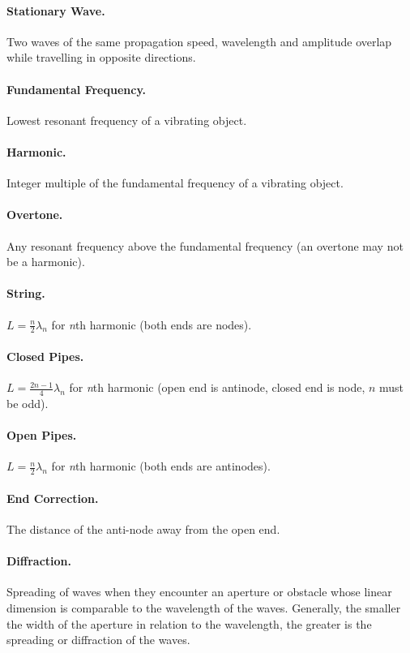 \documentclass{article}
\begin{document}
\paragraph{Stationary Wave.} Two waves of the same propagation speed, wavelength
and amplitude overlap while travelling in opposite directions.

\paragraph{Fundamental Frequency.} Lowest resonant frequency of a vibrating
object.

\paragraph{Harmonic.} Integer multiple of the fundamental frequency of a
vibrating object.

\paragraph{Overtone.} Any resonant frequency above the fundamental frequency (an
overtone may not be a harmonic).

\paragraph{String.} $L = \frac{n}{2} \lambda_n$ for \textit{n}th harmonic (both
ends are nodes).

\paragraph{Closed Pipes.} $L = \frac{2n - 1}{4} \lambda_n$ for \textit{n}th
harmonic (open end is antinode, closed end is node, $n$ must be odd).

\paragraph{Open Pipes.} $L = \frac{n}{2} \lambda_n$ for \textit{n}th harmonic
(both ends are antinodes).

\paragraph{End Correction.} The distance of the anti-node away from the open
end.

\paragraph{Diffraction.} Spreading of waves when they encounter an aperture or
obstacle whose linear dimension is comparable to the wavelength of the waves.
Generally, the smaller the width of the aperture in relation to the wavelength,
the greater is the spreading or diffraction of the waves.
\end{document}
